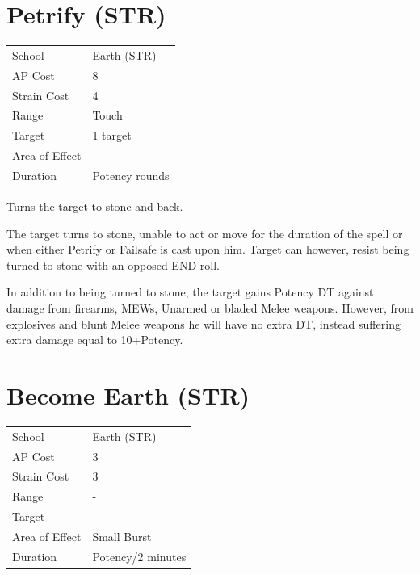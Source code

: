 \documentclass[11pt,a4paper,twocolumn]{book}
\begin{document}
	\section*{Petrify (STR)}
	{
		\begin{tabu} to 75mm{| X[l,4] | X[l,7] |}
			\hline
			School 			&  Earth (STR)			\\
			AP Cost	      	&  8					\\
			Strain Cost     &  4					\\
			Range     		&  Touch				\\
			Target      	&  1 target				\\
			Area of Effect  &  -	 				\\
			Duration     	&  Potency rounds		\\ \hline
		\end{tabu}
		
	}
	
	\medskip

	Turns the target to stone and back.
	
	The target turns to stone, unable to act or move for the duration of the spell or when either Petrify or Failsafe is cast upon him. Target can however, resist being turned to stone with an opposed END roll.
	
	In addition to being turned to stone, the target gains Potency DT against damage from firearms, MEWs, Unarmed or bladed Melee weapons. However, from explosives and blunt Melee weapons he will have no extra DT, instead suffering extra damage equal to 10+Potency.
	
	\section*{Become Earth (STR)}
	{
		\begin{tabu} to 75mm{| X[l,4] | X[l,7] |}
			\hline
			School 			&  Earth (STR)			\\
			AP Cost	      	&  3					\\
			Strain Cost     &  3					\\
			Range     		&  -					\\
			Target      	&  -					\\
			Area of Effect  &  Small Burst	 		\\
			Duration     	&  Potency/2 minutes	\\ \hline
		\end{tabu}
		
	}
	
\end{document}
